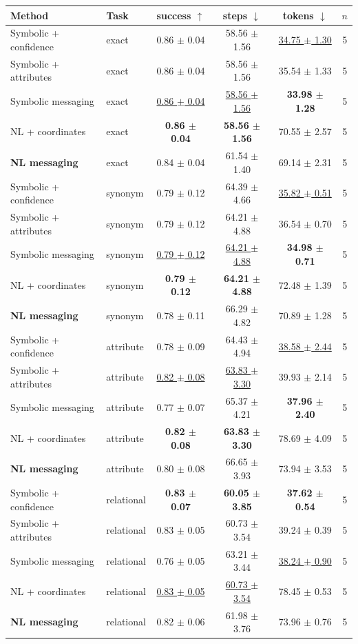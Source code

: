 \begin{tabular}{llcccc}
\toprule
Method & Task & success $\uparrow$ & steps $\downarrow$ & tokens $\downarrow$ & $n$ \\
\midrule
Symbolic + confidence & exact & 0.86 $\pm$ 0.04 & 58.56 $\pm$ 1.56 & \underline{34.75 $\pm$ 1.30} & 5 \\
Symbolic + attributes & exact & 0.86 $\pm$ 0.04 & 58.56 $\pm$ 1.56 & 35.54 $\pm$ 1.33 & 5 \\
Symbolic messaging & exact & \underline{0.86 $\pm$ 0.04} & \underline{58.56 $\pm$ 1.56} & \textbf{33.98 $\pm$ 1.28} & 5 \\
NL + coordinates & exact & \textbf{0.86 $\pm$ 0.04} & \textbf{58.56 $\pm$ 1.56} & 70.55 $\pm$ 2.57 & 5 \\
\textbf{NL messaging} & exact & 0.84 $\pm$ 0.04 & 61.54 $\pm$ 1.40 & 69.14 $\pm$ 2.31 & 5 \\
\midrule
Symbolic + confidence & synonym & 0.79 $\pm$ 0.12 & 64.39 $\pm$ 4.66 & \underline{35.82 $\pm$ 0.51} & 5 \\
Symbolic + attributes & synonym & 0.79 $\pm$ 0.12 & 64.21 $\pm$ 4.88 & 36.54 $\pm$ 0.70 & 5 \\
Symbolic messaging & synonym & \underline{0.79 $\pm$ 0.12} & \underline{64.21 $\pm$ 4.88} & \textbf{34.98 $\pm$ 0.71} & 5 \\
NL + coordinates & synonym & \textbf{0.79 $\pm$ 0.12} & \textbf{64.21 $\pm$ 4.88} & 72.48 $\pm$ 1.39 & 5 \\
\textbf{NL messaging} & synonym & 0.78 $\pm$ 0.11 & 66.29 $\pm$ 4.82 & 70.89 $\pm$ 1.28 & 5 \\
\midrule
Symbolic + confidence & attribute & 0.78 $\pm$ 0.09 & 64.43 $\pm$ 4.94 & \underline{38.58 $\pm$ 2.44} & 5 \\
Symbolic + attributes & attribute & \underline{0.82 $\pm$ 0.08} & \underline{63.83 $\pm$ 3.30} & 39.93 $\pm$ 2.14 & 5 \\
Symbolic messaging & attribute & 0.77 $\pm$ 0.07 & 65.37 $\pm$ 4.21 & \textbf{37.96 $\pm$ 2.40} & 5 \\
NL + coordinates & attribute & \textbf{0.82 $\pm$ 0.08} & \textbf{63.83 $\pm$ 3.30} & 78.69 $\pm$ 4.09 & 5 \\
\textbf{NL messaging} & attribute & 0.80 $\pm$ 0.08 & 66.65 $\pm$ 3.93 & 73.94 $\pm$ 3.53 & 5 \\
\midrule
Symbolic + confidence & relational & \textbf{0.83 $\pm$ 0.07} & \textbf{60.05 $\pm$ 3.85} & \textbf{37.62 $\pm$ 0.54} & 5 \\
Symbolic + attributes & relational & 0.83 $\pm$ 0.05 & 60.73 $\pm$ 3.54 & 39.24 $\pm$ 0.39 & 5 \\
Symbolic messaging & relational & 0.76 $\pm$ 0.05 & 63.21 $\pm$ 3.44 & \underline{38.24 $\pm$ 0.90} & 5 \\
NL + coordinates & relational & \underline{0.83 $\pm$ 0.05} & \underline{60.73 $\pm$ 3.54} & 78.45 $\pm$ 0.53 & 5 \\
\textbf{NL messaging} & relational & 0.82 $\pm$ 0.06 & 61.98 $\pm$ 3.76 & 73.96 $\pm$ 0.76 & 5 \\
\bottomrule
\end{tabular}
